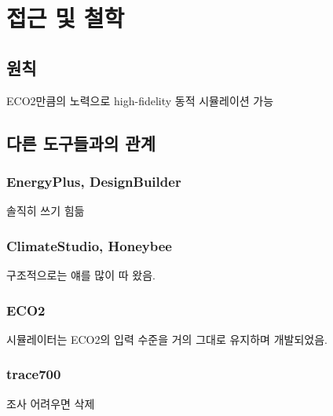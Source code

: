 \section{ 접근 및 철학}

\subsection{원칙}

ECO2만큼의 노력으로 high-fidelity 동적 시뮬레이션 가능

\subsection{다른 도구들과의 관계}
\subsubsection{EnergyPlus, DesignBuilder}
솔직히 쓰기 힘듦

\subsubsection{ClimateStudio, Honeybee}
구조적으로는 얘를 많이 따 왔음.

\subsubsection{ECO2}
시뮬레이터는 ECO2의 입력 수준을 거의 그대로 유지하며 개발되었음.

\subsubsection{trace700}
조사 어려우면 삭제